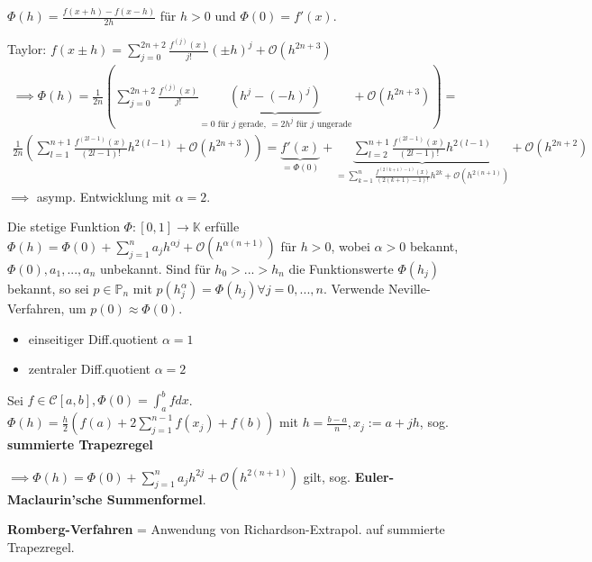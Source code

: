 \begin{example}
	$\Phi(h) = \frac{f(x+h)-f(x-h)}{2h}$ für $h>0$ und $\Phi(0) = f'(x)$.
	
	Taylor: $f(x\pm h) = \sum_{j=0}^{2n+2} \frac{f^{(j)}(x)}{j!}(\pm h)^j + \mathcal{O}(h^{2n+3})$
	\begin{align*}
		\implies \Phi(h) = \frac{1}{2n} \left(\sum_{j=0}^{2n+2} \frac{f^{(j)}(x)}{j!} \underbrace{(h^j - (-h)^j)}_{=0 \text{ für } j \text{ gerade, } = 2h^j \text{ für } j \text{ ungerade}} + \mathcal{O}(h^{2n+3}) \right) =\\
		\frac{1}{2n} \left(\sum_{l=1}^{n+1} \frac{f^{(2l-1)}(x)}{(2l-1)!} h^{2(l-1)} + \mathcal{O}(h^{2n+3}) \right) = \underbrace{f'(x)}_{=\Phi(0)} + \underbrace{\sum_{l=2}^{n+1} \frac{f^{(2l-1)}(x)}{(2l-1)!} h^{2(l-1)}}_{= \sum_{k=1}^{n} \frac{f^{(2(k+1)-1)}(x)}{(2(k+1)-1)!}h^{2k} + \mathcal{O}(h^{2(n+1)})} + \mathcal{O}(h^{2n+2})
	\end{align*}
	$\implies$ asymp. Entwicklung mit $\alpha=2$.
\end{example}

\begin{algorithm}
	Die stetige Funktion $\Phi:[0, 1] \rightarrow \mathbb{K}$ erfülle $\Phi(h) = \Phi(0) + \sum_{j=1}^{n} a_j h^{\alpha j} + \mathcal{O}(h^{\alpha (n+1)})$ für $h>0$, wobei $\alpha > 0$ bekannt, $\Phi(0), a_1, ..., a_n$ unbekannt. Sind für $h_0 > ... > h_n$ die Funktionswerte $\Phi(h_j)$ bekannt, so sei $p \in \mathbb{P}_n$ mit $p(h_j^\alpha) = \Phi(h_j) \forall j=0, ..., n$. Verwende Neville-Verfahren, um $p(0) \approx \Phi(0)$.
\end{algorithm}

\begin{example}
	\begin{itemize}
		\item einseitiger Diff.quotient $\alpha = 1$
		\item zentraler Diff.quotient $\alpha = 2$
	\end{itemize}
\end{example}

\begin{example}
	Sei $f \in \mathcal{C}[a,b], \Phi(0) = \int_a^b f dx$. $\Phi(h) = \frac{h}{2} \left(f(a) + 2 \sum_{j=1}^{n-1}f(x_j) + f(b)\right)$ mit $h = \frac{b-a}{n}, x_j := a + jh$, sog. \textbf{summierte Trapezregel}
	
	$\implies \Phi(h) = \Phi(0) + \sum_{j=1}^{n} a_j h^{2j} + \mathcal{O}(h^{2(n+1)})$ gilt, sog. \textbf{Euler-Maclaurin'sche Summenformel}.
	
	\textbf{Romberg-Verfahren} = Anwendung von Richardson-Extrapol. auf summierte Trapezregel.
\end{example}

